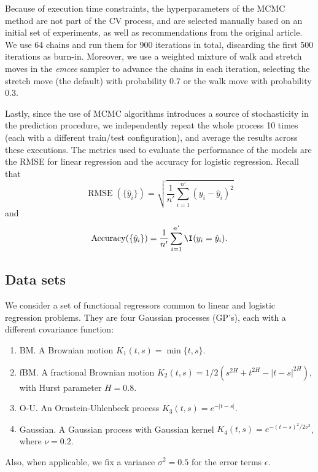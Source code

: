 Because of execution time constraints, the hyperparameters of the MCMC method are not part of the CV process, and are selected manually based on an initial set of experiments, as well as recommendations from the original article. We use 64 chains and run them for 900 iterations in total, discarding the first 500 iterations as burn-in. Moreover, we use a weighted mixture of walk and stretch moves in the \textit{emcee} sampler to advance the chains in each iteration, selecting the stretch move (the default) with probability 0.7 or the walk move with probability 0.3.

Lastly, since the use of MCMC algorithms introduces a source of stochasticity in the prediction procedure, we independently repeat the whole process 10 times (each with a different train/test configuration), and average the results across these executions. The metrics used to evaluate the performance of the models are the RMSE for linear regression and the accuracy for logistic regression. Recall that
\[
\operatorname{RMSE}(\{\hat y_i\}) = \sqrt{\frac{1}{n'}\sum_{i=1}^{n'} (y_i - \hat y_i)^2}
\]
and
\[
\operatorname{Accuracy}(\{\hat y_i\}) = \frac{1}{n'} \sum_{i=1}^{n'} \I(y_i = \hat y_i).
\]

\subsection*{Data sets}

We consider a set of functional regressors common to linear and logistic regression problems. They are four Gaussian processes (GP's), each with a different covariance function:
\begin{enumerate}
  \item BM.\hspace{0.3em} A Brownian motion \(K_1(t,s)=\min\{t,s\}\).
  \item fBM.\hspace{0.3em} A fractional Brownian motion \(K_2(t,s)=1/2(s^{2H} + t^{2H} - |t-s|^{2H})\), with Hurst parameter \(H=0.8\).
  \item O-U.\hspace{0.3em} An Ornstein-Uhlenbeck process \(K_3(t,s)=e^{-|t-s|}\).
  \item Gaussian.\hspace{0.3em} A Gaussian process with Gaussian kernel \(K_4(t,s)=e^{-(t-s)^2/2\nu^2}\), where \(\nu=0.2\).
\end{enumerate}
Also, when applicable, we fix a variance \(\sigma^2=0.5\) for the error terms \(\epsilon\).

